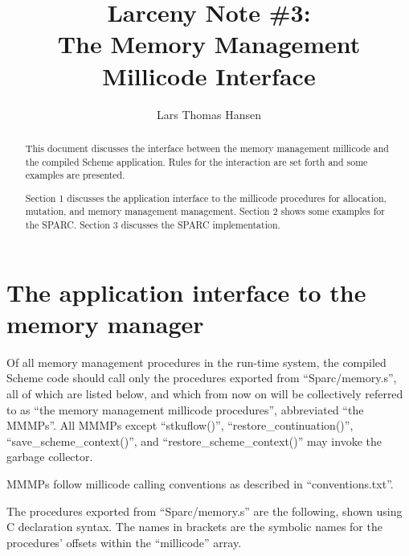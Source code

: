 


\title{Larceny Note \#3: \\
       The Memory Management Millicode Interface}
\author{Lars Thomas Hansen}


\maketitle
\begin{abstract}
This document discusses the interface between the memory management
millicode and the compiled Scheme application. Rules for the
interaction are set forth and some examples are presented.

Section 1 discusses the application interface to the millicode
procedures for allocation, mutation, and memory management management.
Section 2 shows some examples for the SPARC. Section 3 discusses the
SPARC implementation.
\end{abstract}

\section{The application interface to the memory manager}

Of all memory management procedures in the run-time system, the compiled
Scheme code should call only the procedures exported from
``Sparc/memory.s'', all of which are listed below, and which from now on
will be collectively referred to as ``the memory management millicode
procedures'', abbreviated ``the MMMPs''. All MMMPs except ``stkuflow()'',
``restore\_continuation()'', ``save\_scheme\_context()'', and
``restore\_scheme\_context()'' may invoke the garbage collector.

MMMPs follow millicode calling conventions as described in
``conventions.txt''.

The procedures exported from ``Sparc/memory.s'' are the following,
shown using C declaration syntax. The names in brackets are the
symbolic names for the procedures' offsets within the ``millicode''
array.

